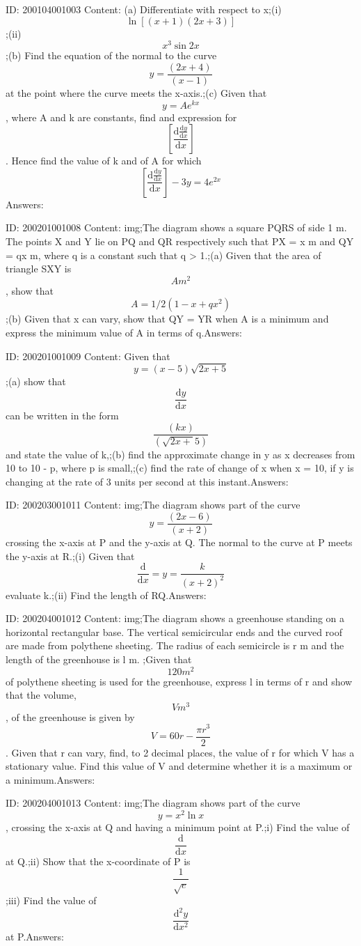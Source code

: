 \documentclass{article}
\begin{document}
ID: 200104001003
Content:
(a)	Differentiate with respect to x;(i)	\[\ln [(x + 1)(2x + 3)]\];(ii)	$$x^3\sin 2x$$;(b)	Find the equation of the normal to the curve $$ y=\frac{(2x+4)}{(x-1)}$$ at the point where the curve meets the x-axis.;(c)	Given that $$y=Ae^{kx}$$, where A and k are constants, find and expression for $$ [\frac{\mathrm{d} \frac{\mathrm{d} y}{\mathrm{d} x}}{\mathrm{d} x}]$$. Hence find the value of k and of A for which $$ [\frac{\mathrm{d} \frac{\mathrm{d} y}{\mathrm{d} x}}{\mathrm{d} x}]-3y=4e^{2x}$$Answers:

ID: 200201001008
Content:
img;The diagram shows a square PQRS of side 1 m. The points X and Y lie on PQ and QR respectively such that PX = x m and QY = qx m, where q is a constant such that q > 1.;(a)	Given that the area of triangle SXY is $$A m^2$$, show that $$A=1/2(1-x+qx^2)$$;(b)	Given that x can vary, show that QY = YR when A is a minimum and express the minimum value of A in terms of q.Answers:

ID: 200201001009
Content:
Given that $$y=(x-5)\sqrt{2x+5}$$;(a)	show that $$ \frac{\mathrm{d} y}{\mathrm{d} x}$$ can be written in the form $$\frac{(kx)}{(\sqrt{2x+}5)}$$ and state the value of k,;(b)	find the approximate change in y as x decreases from 10 to 10 - p, where p is small,;(c)	find the rate of change of x when x = 10, if y is changing at the rate of 3 units per second at this instant.Answers:

ID: 200203001011
Content:
img;The diagram shows part of the curve $$ y=\frac{(2x-6)}{(x+2)}$$ crossing the x-axis at P and the y-axis at Q. The normal to the curve at P meets the y-axis at R.;(i)	Given that $$\frac{\mathrm{d} }{\mathrm{d} x}= y=\frac{k}{(x+2)^2}$$ evaluate k.;(ii)	Find the length of RQ.Answers:

ID: 200204001012
Content:
img;The diagram shows a greenhouse standing on a horizontal rectangular base. The vertical semicircular ends and the curved roof are made from polythene sheeting. The radius of each semicircle is r m and the length of the greenhouse is l m. ;Given that $$120m^2$$ of polythene sheeting is used for the greenhouse, express l in terms of r and show that the volume, $$V m^3$$, of the greenhouse is given by $$V=60r-\frac{\pi r^{3}}{2}$$. Given that r can vary, find, to 2 decimal places, the value of r for which V has a stationary value. Find this value of V and determine whether it is a maximum or a minimum.Answers:

ID: 200204001013
Content:
img;The diagram shows part of the curve $$y=x^2\ln x$$, crossing the x-axis at Q and having a minimum point at P.;i)	Find the value of $$\frac{\mathrm{d} }{\mathrm{d} x}$$ at Q.;ii)	Show that the x-coordinate of P is $$\frac{1}{\sqrt{e}}$$;iii)	Find the value of $$\frac{\mathrm{d} ^{2}y}{\mathrm{d} x^{2}}$$ at P.Answers:
\end{document}
